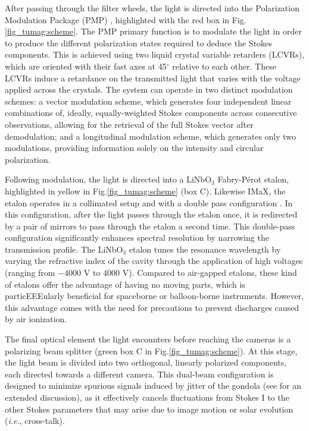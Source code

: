 After passing through the filter wheels, the light is directed into the Polarization Modulation Package (PMP) \citep{pmp1}, highlighted with the red box in Fig.\ref{fig_tumag:scheme}. The PMP primary function is to modulate the light in order to produce the different polarization states required to deduce the Stokes components. This is achieved using two liquid crystal variable retarders (LCVRs), which are oriented with their fast axes at 45$^\circ$ relative to each other. These LCVRs induce a retardance on the transmitted light that varies with the voltage applied across the crystals. The system can operate in two distinct modulation schemes: a vector modulation scheme, which generates four independent linear combinations of, ideally, equally-weighted Stokes components across consecutive observations, allowing for the retrieval of the full Stokes vector after demodulation; and a longitudinal modulation scheme, which generates only two modulations, providing information solely on the intensity and circular polarization.

Following modulation, the light is directed into a LiNbO$_3$ Fabry-Pérot etalon, highlighted in yellow in Fig.\ref{fig_tumag:scheme} (box C). Likewise IMaX, the etalon operates in a collimated setup and with a double pass configuration \citep{etalon-doublepass}. In this configuration, after the light passes through the etalon once, it is redirected by a pair of mirrors to pass through the etalon a second time. This double-pass configuration significantly enhances spectral resolution by narrowing the transmission profile. The LiNbO$_3$ etalon tunes the resonance wavelength by varying the refractive index of the cavity through the application of high voltages (ranging from $-4000$ V to $4000$ V). Compared to air-gapped etalons, these kind of etalons offer the advantage of having no moving parts, which is particEEEularly beneficial for spaceborne or balloon-borne instruments. However, this advantage comes with the need for precautions to prevent discharges caused by air ionization.

The final optical element the light encounters before reaching the cameras is a polarizing beam splitter (green box C in Fig.\ref{fig_tumag:scheme}). At this stage, the light beam is divided into two orthogonal, linearly polarized components, each directed towards a different camera. This dual-beam configuration \citep{lites-doublebeam} is designed to minimize spurious signals induced by jitter of the gondola (see \citealt{libro_JoseCarlos} for an extended discussion), as it effectively cancels fluctuations from Stokes I to the other Stokes parameters that may arise due to image motion or solar evolution (\textit{i.e.}, cross-talk).

